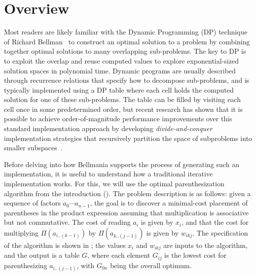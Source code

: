 \section{Overview}
\label{overview}

Most readers are likely familiar with the Dynamic Programming (DP) technique of Richard Bellman~\cite{03/Bellman:DP} to construct an optimal solution to a problem by combining together optimal solutions to many overlapping sub-problems. The key to DP is to exploit the overlap and reuse computed values to explore exponential-sized solution spaces in polynomial time. Dynamic programs are usually described through recurrence relations that specify how to decompose sub-problems, and is typically implemented using a DP table where each cell holds the computed solution for one of these sub-problems. The table can be filled by visiting each cell once in some predetermined order, but recent research has shown that it is possible to achieve order-of-magnitude performance improvements over this standard implementation approach by developing \emph{divide-and-conquer}  implementation strategies that recursively
partition the space of subproblems into smaller subspaces~\cite{IPDPS15/Tithi,SODA14/Bender,SODA06/Chowdhury,SPAA08/Chowdhury,TOCS10/Chowdhury,TCBB10/Chowdhury}. 

Before delving into how Bellmania supports the process of generating such an implementation, it is useful to understand how a traditional iterative implementation works. For this, we will use the 
optimal parenthesization algorithm from the introduction (). The problem description is as follows: given a sequence of factors $a_0\!\cdots a_{n-1}$, 
the goal is to discover a minimal-cost placement of parentheses in the product expression
assuming that multiplication is associative but not commutative. The cost
of reading $a_i$ is given by $x_i$, and that the cost for multiplying
$\Pi(a_{i..(k-1)})$ by $\Pi(a_{k..(j-1)})$ is given by $w_{ikj}$. The specification of the algorithm is shown in ; 
the values $x_i$ and  $w_{ikj}$ are inputs to the algorithm, and the output is a table $G$, where each element $G_{ij}$ is the lowest cost for parenthesizing $a_{i..(j-1)}$, with $G_{0n}$ being the overall optimum.


